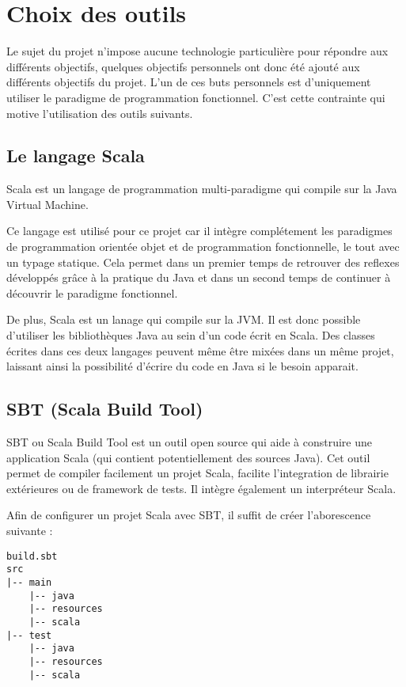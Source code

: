 \section{Choix des outils}

Le sujet du projet n'impose aucune technologie particulière pour répondre aux différents objectifs, quelques objectifs personnels ont donc été ajouté aux différents objectifs du projet. L'un de ces buts personnels est d'uniquement utiliser le paradigme de programmation fonctionnel. C'est cette contrainte qui motive l'utilisation des outils suivants.

\subsection{Le langage Scala}

Scala est un langage de programmation multi-paradigme qui compile sur la Java Virtual Machine.

Ce langage est utilisé pour ce projet car il intègre complétement les paradigmes de programmation orientée objet et de programmation fonctionnelle, le tout avec un typage statique. Cela permet dans un premier temps de retrouver des reflexes développés grâce à la pratique du Java et dans un second temps de continuer à découvrir le paradigme fonctionnel.

De plus, Scala est un lanage qui compile sur la JVM. Il est donc possible d'utiliser les bibliothèques Java au sein d'un code écrit en Scala. Des classes écrites dans ces deux langages peuvent même être mixées dans un même projet, laissant ainsi la possibilité d'écrire du code en Java si le besoin apparait.

\subsection{SBT (Scala Build Tool)}

SBT ou Scala Build Tool est un outil open source qui aide à construire une application Scala (qui contient potentiellement des sources Java). Cet outil permet de compiler facilement un projet Scala, facilite l'integration de librairie extérieures ou de framework de tests. Il intègre également un interpréteur Scala.

\newpage

Afin de configurer un projet Scala avec SBT, il suffit de créer l'aborescence suivante :

\begin{verbatim}
build.sbt
src
|-- main
    |-- java
    |-- resources
    |-- scala
|-- test
    |-- java
    |-- resources
    |-- scala
\end{verbatim}

